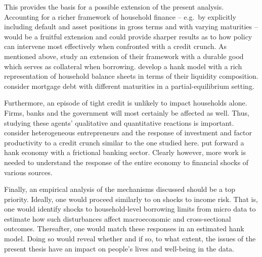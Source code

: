 \documentclass[a4paper,12pt]{article} %
\numberwithin{equation}{section} %
\numberwithin{figure}{section}
\numberwithin{table}{section}
\begin{document}
This provides the basis for a possible extension of the present analysis. Accounting for a richer framework of household finance -- e.g.~by explicitly including default and asset positions in gross terms and with varying maturities -- would be a fruitful extension and could provide sharper results as to how policy can intervene most effectively when confronted with a credit crunch. As mentioned above, \textcite{gl2017} study an extension of their framework with a durable good which serves as collateral when borrowing. \textcite{kaplan2018} develop a \Gls{hank} model with a rich representation of household balance sheets in terms of their liquidity composition. \textcite{guerrieri2020} consider mortgage debt with different maturities in a partial-equilibrium setting.

Furthermore, an episode of tight credit is unlikely to impact households alone. Firms, banks and the government will most certainly be affected as well. Thus, studying these agents' qualitative and quantitative reactions is important. \textcite{buera2020} consider heterogeneous entrepreneurs and the response of investment and factor productivity to a credit crunch similar to the one studied here. \textcite{lee2021} put forward a \Gls{hank} economy with a frictional banking sector. Clearly however, more work is needed to understand the response of the entire economy to financial shocks of various sources.

Finally, an empirical analysis of the mechanisms discussed should be a top priority. Ideally, one would proceed similarly to \textcite{bayer2019} on shocks to income risk. That is, one would identify shocks to household-level borrowing limits from micro data to estimate how such disturbances affect macroeconomic and cross-sectional outcomes. Thereafter, one would match these responses in an estimated \Gls{hank} model. Doing so would reveal whether and if so, to what extent, the issues of the present thesis have an impact on people's lives and well-being in the data.

\newpage
\thispagestyle{plain}
\printbibliography[heading=bibintoc] %
\end{document}
